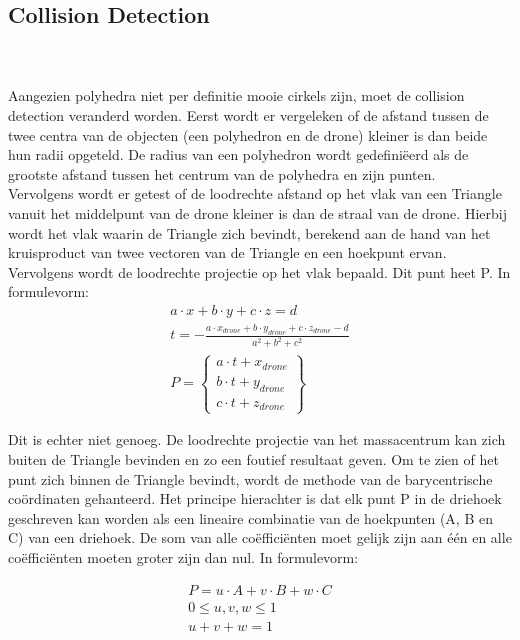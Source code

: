 \subsection{Collision Detection}
\\\\
Aangezien polyhedra niet per definitie mooie cirkels zijn, moet de collision detection veranderd worden. Eerst wordt er vergeleken of de afstand tussen de twee centra van de objecten (een polyhedron en de drone) kleiner is dan beide hun radii opgeteld. De radius van een polyhedron wordt gedefiniëerd als de grootste afstand tussen het centrum van de polyhedra en zijn punten. \\
\noindent
Vervolgens wordt er getest of de loodrechte afstand op het vlak van een Triangle vanuit het middelpunt van de drone kleiner is dan de straal van de drone. Hierbij wordt het vlak waarin de Triangle zich bevindt, berekend aan de hand van het kruisproduct van twee vectoren van de Triangle en een hoekpunt ervan. Vervolgens wordt de loodrechte projectie op het vlak bepaald. Dit punt heet P. In formulevorm: 
\begin{gather*}
	a\cdot x + b\cdot y + c\cdot z = d \\ 
	t = -\frac{a \cdot x_{drone} + b \cdot y_{drone} + c \cdot z_{drone} - d}{a^2 + b^2 + c^2}  \\ P =
	\begin{Bmatrix}
	a\cdot t + x_{drone}\\ 
	b\cdot t + y_{drone}\\ 
	c\cdot t + z_{drone}
	\end{Bmatrix}
\end{gather*}

\noindent
 Dit is echter niet genoeg. De loodrechte projectie van het massacentrum  kan zich buiten de Triangle bevinden en zo een foutief resultaat geven. Om te zien of het punt zich binnen de Triangle bevindt, wordt de methode van de barycentrische coördinaten \cite{website:barycentric-coordinates} gehanteerd. Het principe hierachter is dat elk punt P in de driehoek geschreven kan worden als een lineaire combinatie van de hoekpunten (A, B en C) van een driehoek. De som van alle co\"effici\"enten moet gelijk zijn aan één en alle co\"effici\"enten moeten groter zijn dan nul. In formulevorm:
 
 \begin{gather*}
 	P = u\cdot A + v\cdot B + w\cdot C \\
 	0 \le u,v,w \le 1 \\
 	u + v + w = 1
 \end{gather*}

